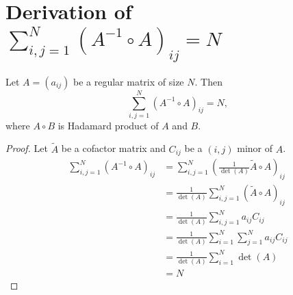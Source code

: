 \documentclass{article}
\begin{document}
\section{Derivation of \texorpdfstring{$\sum_{i, j = 1}^N (A^{-1} \circ A)_{ij} = N$}{sum of Hadamard products}}\label{sec:derivation-of-sum}
\begin{prop}
Let $A = (a_{ij})$ be a regular matrix of size $N$.
Then
\[
    \sum_{i, j = 1}^N (A^{-1} \circ A)_{ij} = N,
\]
where $A \circ B$ is Hadamard product of $A$ and $B$.
\end{prop}
\begin{proof}
Let $\tilde{A}$ be a cofactor matrix and $C_{ij}$ be a $(i, j)$ minor of $A$.
\begin{equation*}
\begin{split}
\sum_{i, j = 1}^N (A^{-1} \circ A)_{ij}  
    &= \sum_{i, j = 1}^N \left(\frac{1}{\det(A)}\tilde{A} \circ A\right)_{ij} \\
    &= \frac{1}{\det(A)}\sum_{i, j = 1}^N (\tilde{A}\circ A)_{ij} \\
    &= \frac{1}{\det(A)}\sum_{i, j = 1}^N a_{ij}C_{ij} \\
    &= \frac{1}{\det(A)}\sum_{i = 1}^N \sum_{j = 1}^N a_{ij}C_{ij}\\
    &= \frac{1}{\det(A)}\sum_{i = 1}^N \det(A) \\
    &= N
\end{split}
\end{equation*}
\end{proof}
\end{document}
